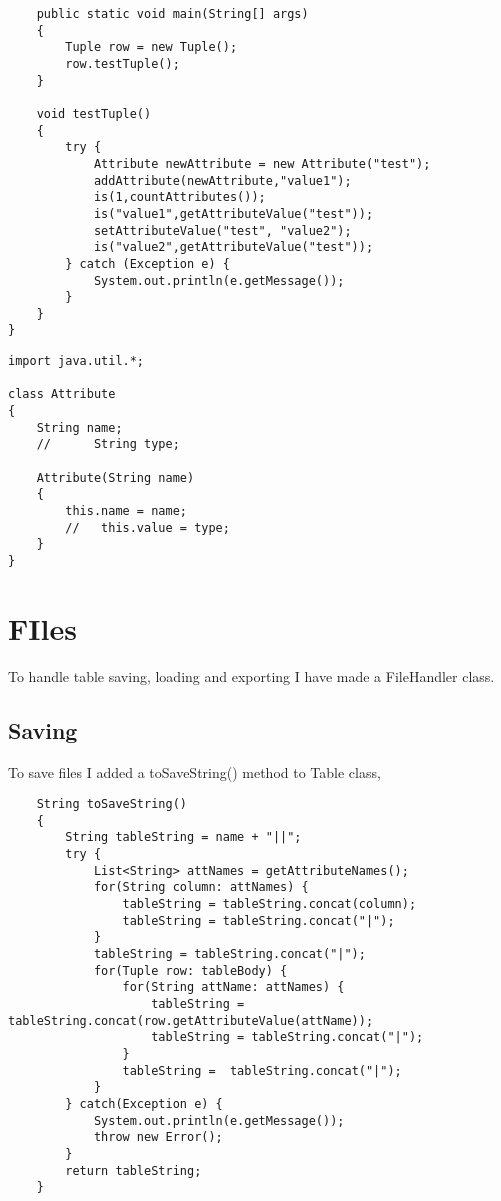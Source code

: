 \documentclass[11pt]{article} %
\begin{document}
\begin{lstlisting}
    public static void main(String[] args)
    {
        Tuple row = new Tuple();
        row.testTuple();
    }

    void testTuple()
    {
        try {
            Attribute newAttribute = new Attribute("test");
            addAttribute(newAttribute,"value1");
            is(1,countAttributes());
            is("value1",getAttributeValue("test"));
            setAttributeValue("test", "value2");
            is("value2",getAttributeValue("test"));
        } catch (Exception e) {
            System.out.println(e.getMessage());
        }
    }
}

\end{lstlisting}

\begin{lstlisting}
import java.util.*;

class Attribute
{
    String name;
    //      String type;
    
    Attribute(String name)
    {
        this.name = name;
        //   this.value = type;
    }
}
\end{lstlisting}











\section{FIles} 
To handle table saving, loading and exporting I have made a FileHandler class. 





\subsection{Saving}
To save files I added a toSaveString() method to Table class, 

\begin{lstlisting}
    String toSaveString()
    {
        String tableString = name + "||";
        try {
            List<String> attNames = getAttributeNames();
            for(String column: attNames) {
                tableString = tableString.concat(column);
                tableString = tableString.concat("|");
            }
            tableString = tableString.concat("|");
            for(Tuple row: tableBody) {
                for(String attName: attNames) {
                    tableString = tableString.concat(row.getAttributeValue(attName));
                    tableString = tableString.concat("|");
                }
                tableString =  tableString.concat("|");
            }
        } catch(Exception e) {
            System.out.println(e.getMessage());
            throw new Error();
        }
        return tableString;
    }
\end{lstlisting}
\end{document}
